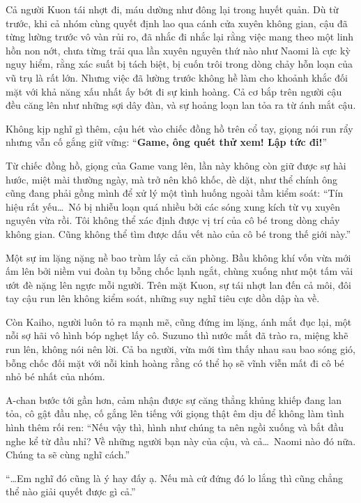 \documentclass[../main.tex]{subfiles}
\begin{document}
Cả người Kuon tái nhợt đi, máu dường như đông lại trong huyết quản. Dù từ trước, khi cả nhóm cùng quyết định lao qua cánh cửa xuyên không gian, cậu đã từng lường trước vô vàn rủi ro, đã nhắc đi nhắc lại rằng việc mang theo một linh hồn non nớt, chưa từng trải qua lần xuyên nguyên thứ nào như Naomi là cực kỳ nguy hiểm, rằng xác suất bị tách biệt, bị cuốn trôi trong dòng chảy hỗn loạn của vũ trụ là rất lớn. Nhưng việc đã lường trước không hề làm cho khoảnh khắc đối mặt với khả năng xấu nhất ấy bớt đi sự kinh hoàng. Cả cơ bắp trên người cậu đều căng lên như những sợi dây đàn, và sự hoảng loạn lan tỏa ra từ ánh mắt cậu.

Không kịp nghĩ gì thêm, cậu hét vào chiếc đồng hồ trên cổ tay, giọng nói run rẩy nhưng vẫn cố gắng giữ vững: ``\textbf{Game, ông quét thử xem! Lập tức đi!}''

Từ chiếc đồng hồ, giọng của Game vang lên, lần này không còn giữ được sự hài hước, miệt mài thường ngày, mà trở nên khô khốc, dè dặt, như thể chính ông cũng đang phải gồng mình để xử lý một tình huống ngoài tầm kiểm soát: ``Tín hiệu rất yếu\dots\ Nó bị nhiễu loạn quá nhiều bởi các sóng xung kích từ vụ xuyên nguyên vừa rồi. Tôi không thể xác định được vị trí của cô bé trong dòng chảy không gian. Cũng không thể tìm được dấu vết nào của cô bé trong thế giới này.''

Một sự im lặng nặng nề bao trùm lấy cả căn phòng. Bầu không khí vốn vừa mới ấm lên bởi niềm vui đoàn tụ bỗng chốc lạnh ngắt, chùng xuống như một tấm vải ướt đè nặng lên ngực mỗi người. Trên mặt Kuon, sự tái nhợt lan đến cả môi, đôi tay cậu run lên không kiểm soát, những suy nghĩ tiêu cực dồn dập ùa về.

Còn Kaiho, người luôn tỏ ra mạnh mẽ, cũng đứng im lặng, ánh mắt đục lại, một nỗi sợ hãi vô hình bóp nghẹt lấy cô. Suzuno thì nước mắt đã trào ra, miệng khẽ run lên, không nói nên lời. Cả ba người, vừa mới tìm thấy nhau sau bao sóng gió, bỗng chốc đối mặt với nỗi kinh hoàng rằng có thể họ sẽ vĩnh viễn mất đi cô bé nhỏ bé nhất của nhóm.

A-chan bước tới gần hơn, cảm nhận được sự căng thẳng khủng khiếp đang lan tỏa, cô gật đầu nhẹ, cố gắng lên tiếng với giọng thật êm dịu để không làm tình hình thêm rối ren: ``Nếu vậy thì, hình như chúng ta nên ngồi xuống và bắt đầu nghe kể từ đầu nhỉ? Về những người bạn này của cậu, và cả\dots\ Naomi nào đó nữa. Chúng ta sẽ cùng nghĩ cách.''

``\dots Em nghĩ đó cũng là ý hay đấy ạ. Nếu mà cứ đứng đó lo lắng thì cũng chẳng thể nào giải quyết được gì cả.''
\end{document}
